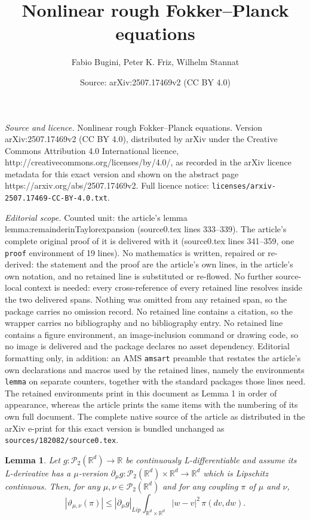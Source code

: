 \documentclass[10pt,a4paper]{amsart}
\title{Nonlinear rough Fokker--Planck equations}
\author{Fabio Bugini, Peter K. Friz, Wilhelm Stannat}
\date{Source: arXiv:2507.17469v2 (CC BY 4.0)}
\newtheorem{lemma}{Lemma}
\newcommand{\R}{\mathbb{R}}
\begin{document}
\maketitle

\noindent\emph{Source and licence.} Nonlinear rough Fokker--Planck equations. Version arXiv:2507.17469v2 (CC BY 4.0), distributed by arXiv under the Creative Commons Attribution 4.0 International licence, http://creativecommons.org/licenses/by/4.0/, as recorded in the arXiv licence metadata for this exact version and shown on the abstract page https://arxiv.org/abs/2507.17469v2. Full licence notice: \texttt{licenses/arxiv-2507.17469-CC-BY-4.0.txt}.\par\smallskip

\noindent\textit{Editorial scope.} Counted unit: the article's lemma lemma:remainderinTaylorexpansion (source0.tex lines 333--339). The article's complete original proof of it is delivered with it (source0.tex lines 341--359, one \texttt{proof} environment of 19 lines). No mathematics is written, repaired or re-derived: the statement and the proof are the article's own lines, in the article's own notation, and no retained line is substituted or re-flowed.  No further source-local context is needed: every cross-reference of every retained line resolves inside the two delivered spans.  Nothing was omitted from any retained span, so the package carries no omission record.  No retained line contains a citation, so the wrapper carries no bibliography and no bibliography entry.  No retained line contains a figure environment, an image-inclusion command or drawing code, so no image is delivered and the package declares no asset dependency.  Editorial formatting only, in addition: an AMS \texttt{amsart} preamble that restates the article's own declarations and macros used by the retained lines, namely the environments \texttt{lemma} on separate counters, together with the standard packages those lines need.  The retained environments print in this document as Lemma 1 in order of appearance, whereas the article prints the same items with the numbering of its own full document.  The complete native source of the article as distributed in the arXiv e-print for this exact version is bundled unchanged as \texttt{sources/182082/source0.tex}.
    \begin{lemma} \label{lemma:remainderinTaylorexpansion}
        Let $g: \mathcal{P}_2(\R^d) \to \R$ be continuously L-differentiable and assume its L-derivative has a $\mu$-version $\partial_\mu g: \mathcal{P}_2(\R^d) \times \R^d \to \R^d$ which is Lipschitz continuous. Then, for any $\mu,\nu \in \mathcal{P}_2(\R^d)$ and for any coupling $\pi$ of $\mu$ and $\nu$, 
            \begin{equation*} 
            | \vartheta_{\mu,\nu} (\pi) | \le  |\partial_\mu g|_{Lip}  \int_{\R^d \times \R^d} |w-v|^2 \, \pi(dv, dw) .
        \end{equation*}
    \end{lemma}
\end{document}
